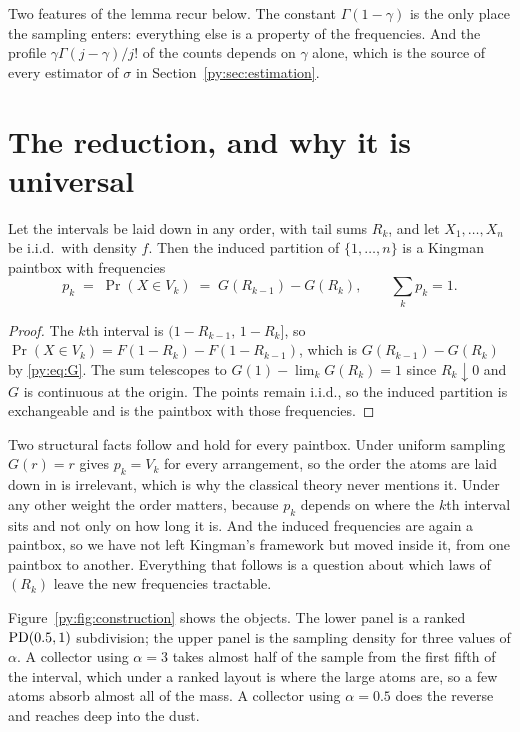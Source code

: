 Two features of the lemma recur below. The constant $\Gamma(1-\gamma)$ is the only place the
sampling enters: everything else is a property of the frequencies. And the profile
$\gamma\Gamma(j-\gamma)/j!$ of the counts depends on $\gamma$ alone, which is the source of every
estimator of $\sigma$ in Section~\ref{py:sec:estimation}.

\section{The reduction, and why it is universal}
\label{py:sec:reduction}

\begin{lemma}[Reduction]
\label{py:lem:pit}
Let the intervals be laid down in any order, with tail sums $R_k$, and let $X_1,\dots,X_n$ be
i.i.d.\ with density $f$. Then the induced partition of $\{1,\dots,n\}$ is a Kingman paintbox with
frequencies
\[
p_k \;=\; \Pr(X \in V_k) \;=\; G(R_{k-1}) - G(R_k),
\qquad \sum_k p_k = 1 .
\]
\end{lemma}

\begin{proof}
The $k$th interval is $(1-R_{k-1},\,1-R_k]$, so $\Pr(X \in V_k) = F(1-R_k) - F(1-R_{k-1})$, which is
$G(R_{k-1})-G(R_k)$ by \eqref{py:eq:G}. The sum telescopes to $G(1)-\lim_k G(R_k) = 1$ since
$R_k \downarrow 0$ and $G$ is continuous at the origin. The points remain i.i.d., so the induced
partition is exchangeable and is the paintbox with those frequencies.
\end{proof}

Two structural facts follow and hold for every paintbox. Under uniform sampling $G(r) = r$ gives
$p_k = V_k$ for every arrangement, so the order the atoms are laid down in is irrelevant, which is
why the classical theory never mentions it. Under any other weight the order matters, because
$p_k$ depends on where the $k$th interval sits and not only on how long it is. And the induced
frequencies are again a paintbox, so we have not left Kingman's framework but moved inside it, from
one paintbox to another. Everything that follows is a question about which laws of $(R_k)$ leave
the new frequencies tractable.

Figure~\ref{py:fig:construction} shows the objects. The lower panel is a ranked $\mathrm{PD}(0.5,1)$
subdivision; the upper panel is the sampling density for three values of $\alpha$. A collector
using $\alpha = 3$ takes almost half of the sample from the first fifth of the interval, which under a
ranked layout is where the large atoms are, so a few atoms absorb almost all of the mass. A
collector using $\alpha = 0.5$ does the reverse and reaches deep into the dust.

